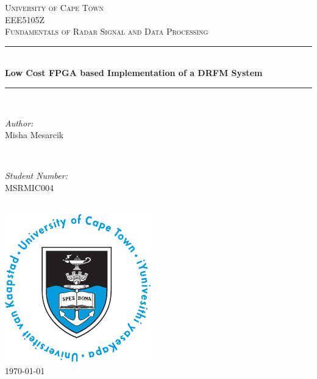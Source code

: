 	\begin{titlepage}
		
		\newcommand{\HRule}{\rule{\linewidth}{0.5mm}} %

		\center %
		
		\textsc{\LARGE University of Cape Town}\\[1.5cm] %
		\textsc{\Large EEE5105Z}\\[0.5cm] %
		\textsc{\large Fundamentals of Radar Signal and Data Processing
		}\\[0.5cm] %
		
		\HRule \\[0.4cm]
		{ \huge \bfseries Low Cost FPGA based Implementation of a DRFM System}\\[0.3cm] %
		\HRule \\[0.4cm]
		
				
		\begin{minipage}{0.4\textwidth}
			\begin{flushleft} \large
				\emph{Author:}\\
				Misha Mesarcik

			\end{flushleft}
		\end{minipage}
		~
		\begin{minipage}{0.4\textwidth}
			\begin{flushright} \large
				\emph{Student Number:} \\
				MSRMIC004 %
			\end{flushright}
		\end{minipage}\\[2cm]

		\includegraphics[scale =1.5]{img/logo}\\[2cm] %
	
		{\large \today}\\[3cm] %
		

		
		\vfill %
		
	\end{titlepage}
	
